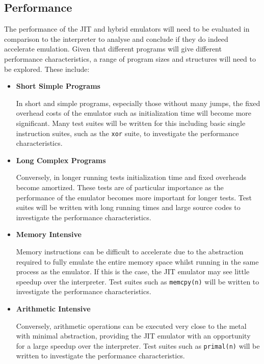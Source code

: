 \subsection{Performance}
\label{section:req-cap-performance}

The performance of the JIT and hybrid emulators will need to be evaluated in comparison to the interpreter to analyse and conclude if they do indeed accelerate emulation. Given that different programs will give different performance characteristics, a range of program sizes and structures will need to be explored. These include:

\begin{itemize}
    \item \textbf{Short Simple Programs}
    
    In short and simple programs, especially those without many jumps, the fixed overhead costs of the emulator such as initialization time will become more significant. Many test suites will be written for this including basic single instruction suites, such as the \texttt{xor} suite, to investigate the performance characteristics.
    
    \item \textbf{Long Complex Programs}
    
    Conversely, in longer running tests initialization time and fixed overheads become amortized. These tests are of particular importance as the performance of the emulator becomes more important for longer tests. Test suites will be written with long running times and large source codes to investigate the performance characteristics.

    \item \textbf{Memory Intensive}
    
    Memory instructions can be difficult to accelerate due to the abstraction required to fully emulate the entire memory space whilst running in the same process as the emulator. If this is the case, the JIT emulator may see little speedup over the interpreter. Test suites such as \texttt{memcpy(n)} will be written to investigate the performance characteristics.

    \item \textbf{Arithmetic Intensive}
    
    Conversely, arithmetic operations can be executed very close to the metal with minimal abstraction, providing the JIT emulator with an opportunity for a large speedup over the interpreter. Test suites such as \texttt{primal(n)} will be written to investigate the performance characteristics.


\end{itemize}
